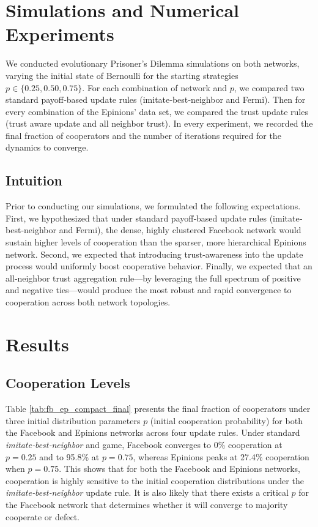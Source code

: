 \section{Simulations and Numerical Experiments}

We conducted evolutionary Prisoner’s Dilemma simulations on both networks, varying the initial state of Bernoulli for the starting strategies \(p \in \{0.25, 0.50, 0.75\}\). For each combination of network and \(p\), we compared two standard payoff‐based update rules (imitate‐best‐neighbor and Fermi). Then for every combination of the Epinions' data set, we compared the trust update rules (trust aware update and all neighbor trust).  In every experiment, we recorded the final fraction of cooperators and the number of iterations required for the dynamics to converge.


\subsection{Intuition}
Prior to conducting our simulations, we formulated the following expectations. First, we hypothesized that under standard payoff‐based update rules (imitate‐best‐neighbor and Fermi), the dense, highly clustered Facebook network would sustain higher levels of cooperation than the sparser, more hierarchical Epinions network. Second, we expected that introducing trust-awareness into the update process would uniformly boost cooperative behavior. Finally, we expected that an all‐neighbor trust aggregation rule—by leveraging the full spectrum of positive and negative ties—would produce the most robust and rapid convergence to cooperation across both network topologies.


\section{Results}

\subsection{Cooperation Levels}
Table \ref{tab:fb_ep_compact_final} presents the final fraction of cooperators under three initial distribution parameters \(p\) (initial cooperation probability) for both the Facebook and Epinions networks across four update rules. 
Under standard \emph{imitate‐best‐neighbor} and game, Facebook converges to 0\% cooperation at \(p=0.25\) and to 95.8\% at \(p=0.75\), whereas Epinions peaks at 27.4\% cooperation when \(p=0.75\). 
This shows that for both the Facebook and Epinions networks, cooperation is highly sensitive to the initial cooperation distributions under the \emph{imitate‐best‐neighbor} update rule. 
It is also likely that there exists a critical \(p\) for the Facebook network that determines whether it will converge to majority cooperate or defect.

